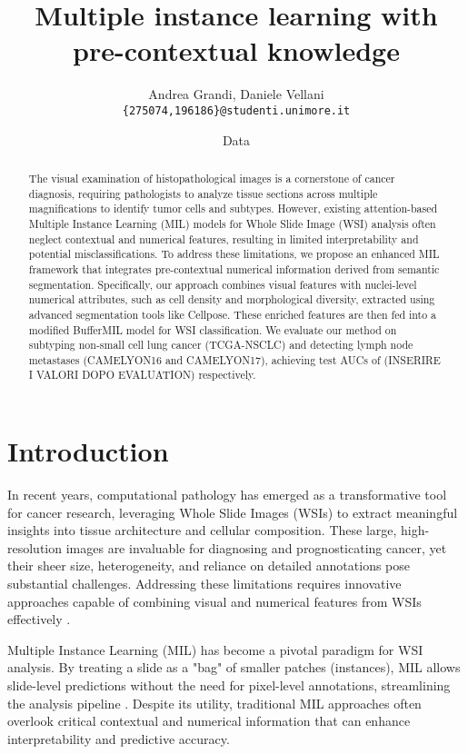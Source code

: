 \documentclass[10pt,twocolumn]{article}
\title{\textbf{Multiple instance learning with pre-contextual knowledge}}
\author{Andrea Grandi, Daniele Vellani \\
\texttt{\{275074,196186\}@studenti.unimore.it}}
\date{Data}
\begin{document}
\maketitle

\begin{abstract}
\noindent 
The visual examination of histopathological images is a cornerstone of cancer diagnosis, requiring pathologists to analyze tissue sections across multiple magnifications to identify tumor cells and subtypes. However, existing attention-based Multiple Instance Learning (MIL) models for Whole Slide Image (WSI) analysis often neglect contextual and numerical features, resulting in limited interpretability and potential misclassifications. To address these limitations, we propose an enhanced MIL framework that integrates pre-contextual numerical information derived from semantic segmentation. Specifically, our approach combines visual features with nuclei-level numerical attributes, such as cell density and morphological diversity, extracted using advanced segmentation tools like Cellpose. These enriched features are then fed into a modified BufferMIL model for WSI classification. We evaluate our method on subtyping non-small cell lung cancer (TCGA-NSCLC) and detecting lymph node metastases (CAMELYON16 and CAMELYON17), achieving test AUCs of (INSERIRE I VALORI DOPO EVALUATION) respectively. 

\end{abstract}

\section{Introduction}
In recent years, computational pathology has emerged as a transformative tool for cancer research, leveraging Whole Slide Images (WSIs) to extract meaningful insights into tissue architecture and cellular composition. These large, high-resolution images are invaluable for diagnosing and prognosticating cancer, yet their sheer size, heterogeneity, and reliance on detailed annotations pose substantial challenges. Addressing these limitations requires innovative approaches capable of combining visual and numerical features from WSIs effectively \cite{litjens2017survey, campanella2019clinical}.

Multiple Instance Learning (MIL) has become a pivotal paradigm for WSI analysis. By treating a slide as a "bag" of smaller patches (instances), MIL allows slide-level predictions without the need for pixel-level annotations, streamlining the analysis pipeline \cite{ilse2018attention, campanella2019clinical}. Despite its utility, traditional MIL approaches often overlook critical contextual and numerical information that can enhance interpretability and predictive accuracy.
\end{document}
